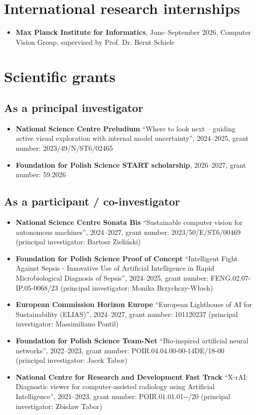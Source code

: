 \section{International research internships}
\begin{itemize}
    \item \textbf{Max Planck Institute for Informatics}, June--September 2026, Computer Vision Group, supervised by Prof. Dr. Bernt Schiele
\end{itemize}

\section{Scientific grants}
\begingroup
\sloppy
\subsection{As a principal investigator}
\begin{itemize}
    \item \textbf{National Science Centre Preludium} ``Where to look next -- guiding active visual exploration with
    internal model uncertainty'', 2024--2025, grant number: 2023/49/N/ST6/02465
    \item \textbf{Foundation for Polish Science START scholarship}, 2026--2027, grant number: 59.2026
\end{itemize}

\subsection{As a participant / co-investigator}
\begin{itemize}
    \item \textbf{National Science Centre Sonata Bis} ``Sustainable computer vision for autonomous machines'', 2024--2027, grant number: 2023/50/E/ST6/00469 (principal investigator: Bartosz Zieliński)
    \item \textbf{Foundation for Polish Science Proof of Concept} ``Intelligent Fight Against Sepsis - Innovative Use of Artificial Intelligence in Rapid Microbiological Diagnosis of Sepsis'', 2024--2025, grant number: FENG.02.07-IP.05-0068/23 (principal investigator: Monika Brzychczy-Włoch)
    \item \textbf{European Commission Horizon Europe} ``European Lighthouse of AI for Sustainability (ELIAS)'', 2024--2027, grant number: 101120237 (principal investigator: Massimiliano Pontil)
    \item \textbf{Foundation for Polish Science Team-Net} ``Bio-inspired artificial neural networks'', 2022--2023, grant number: POIR.04.04.00-00-14DE/18-00 (principal investigator: Jacek Tabor)
    \item \textbf{National Centre for Research and Development Fast Track} ``X-rAI: Diagnostic viewer for computer-assisted radiology using Artificial Intelligence'', 2021--2023, grant number: POIR.01.01.01--/20 (principal investigator: Zbisław Tabor)
\end{itemize}

